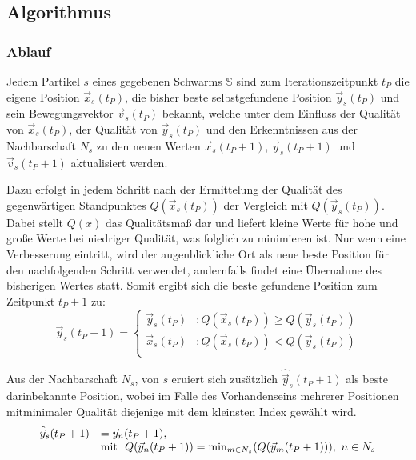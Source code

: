 \subsection{Algorithmus}
\subsubsection{Ablauf}
  Jedem Partikel $s$ eines gegebenen Schwarms $\mathbb{S}$ sind zum Iterationszeitpunkt $t_P$ die eigene Position $\vec{x}_s(t_P)$, die bisher beste selbstgefundene Position $\vec{y}_s(t_P)$ und sein Bewegungsvektor $\vec{v}_s(t_P)$ bekannt, welche unter dem Einfluss der Qualität von $\vec{x}_s(t_P)$, der Qualität von $\vec{y}_s(t_P)$ und den Erkenntnissen aus der Nachbarschaft $N_s$ zu den neuen Werten $\vec{x}_s(t_P+1)$, $\vec{y}_s(t_P+1)$ und $\vec{v}_s(t_P+1)$ aktualisiert werden.

  Dazu erfolgt in jedem Schritt nach der Ermittelung der Qualität des gegenwärtigen Standpunktes $Q(\vec{x}_s(t_P))$ der Vergleich mit $Q(\vec{y}_s(t_P))$. Dabei stellt $Q(x)$ das Qualitätsmaß dar und liefert kleine Werte für hohe und große Werte bei niedriger Qualität, was folglich zu minimieren ist. Nur wenn eine Verbesserung eintritt, wird der augenblickliche Ort als neue beste Position für den nachfolgenden Schritt verwendet, andernfalls findet eine Übernahme des bisherigen Wertes statt. Somit ergibt sich die beste gefundene Position zum Zeitpunkt $t_P+1$ zu:
  \begin{equation}\label{DefMyBestPos}
    \vec{y}_s(t_P+1) = \begin{cases}
    		 \vec{y}_s(t_P) &: Q(\vec{x}_s(t_P)) \geq Q(\vec{y}_s(t_P))\\
		 \vec{x}_s(t_P) &: Q(\vec{x}_s(t_P)) < Q(\vec{y}_s(t_P))\\
	       \end{cases}
  \end{equation}
  
  \noindent Aus der Nachbarschaft $N_s$, von $s$ eruiert sich zusätzlich $\hat{\vec{y}}_s(t_P+1)$ als beste darin\linebreak bekannte Position, wobei im Falle des Vorhandenseins mehrerer Positionen mit\linebreak minimaler Qualität diejenige mit dem kleinsten Index gewählt wird.
  \begin{equation}\label{DefLokalBestPos}
    \begin{array}{ll}
      \hat{\vec{y}}_s(t_P+1) &= \vec{y}_n(t_P+1),\\
      &\textrm{mit \space} Q(\vec{y}_n(t_P+1)) = \min_{m\in N_s}(Q(\vec{y}_m(t_P+1))),\textrm{\space} n\in N_s
    \end{array}
  \end{equation}

